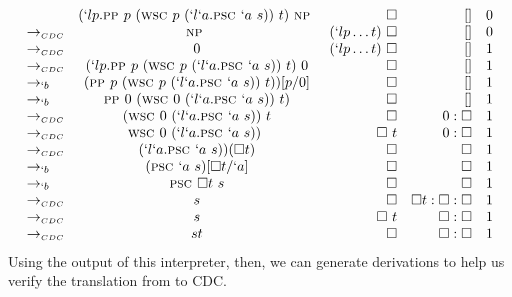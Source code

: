 {
\[
\begin{array}{lcrrr}
         & (`lp.\textsc{pp } p\ (\textsc{wsc } p\ (`l`a.\textsc{psc } `a\ s))\ t)\ \textsc{np } & \square & []                        & 0 \\
\to_{\scriptscriptstyle{CDC}} & \textsc{np } & (`lp \dots t)\ \square & []                                                      & 0 \\
\to_{\scriptscriptstyle{CDC}} & 0 & (`lp \dots t)\ \square & []                                                        & 1 \\
\to_{\scriptscriptstyle{CDC}} & (`lp.\textsc{pp } p\ (\textsc{wsc } p\ (`l`a.\textsc{psc } `a\ s))\ t)\ 0 & \square    & []                        & 1 \\
\to_{`b} & (\textsc{pp } p\ (\textsc{wsc } p\ (`l`a.\textsc{psc } `a\ s))\ t))[p/0]  & \square    & []                        & 1 \\
\to_{`b} & \textsc{pp } 0\ (\textsc{wsc } 0\ (`l`a.\textsc{psc } `a\ s))\ t)         & \square    & []                        & 1 \\
\to_{\scriptscriptstyle{CDC}} & (\textsc{wsc } 0\ (`l`a.\textsc{psc } `a\ s))\ t                 & \square    & 0:\square                 & 1 \\
\to_{\scriptscriptstyle{CDC}} & \textsc{wsc } 0\ (`l`a.\textsc{psc } `a\ s))\                    & \square\ t & 0:\square                 & 1 \\
\to_{\scriptscriptstyle{CDC}} & (`l`a.\textsc{psc } `a\ s))(\square t)                  & \square    & \square                   & 1 \\
\to_{`b} & (\textsc{psc } `a\ s)[\square t/`a]                     & \square    & \square                   & 1 \\
\to_{`b} & \textsc{psc } \square t\ s                              & \square    & \square                   & 1 \\
\to_{\scriptscriptstyle{CDC}} & s                                              & \square    & \square t:\square:\square & 1 \\
\to_{\scriptscriptstyle{CDC}} & s                                              & \square\ t & \square:\square           & 1 \\
\to_{\scriptscriptstyle{CDC}} & st                                             & \square    & \square:\square           & 1 \\
\end{array}
\]
}
Using the output of this interpreter, then, we can generate derivations to help us verify the translation from \lmu to CDC.
